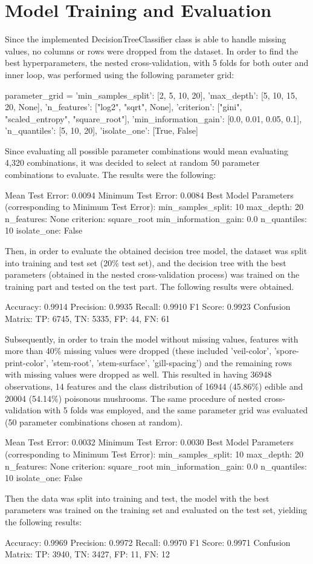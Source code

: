 \documentclass{article}
\begin{document}
\section{Model Training and Evaluation}

Since the implemented DecisionTreeClassifier class is able to handle missing values, no columns or rows were dropped from the dataset. In order to find the best hyperparameters, the nested cross-validation, with 5 folds for both outer and inner loop, was performed using the following parameter grid:

parameter_grid = {
    'min_samples_split': [2, 5, 10, 20],
    'max_depth': [5, 10, 15, 20, None],
    'n_features': ["log2", "sqrt", None],
    'criterion': ["gini", "scaled_entropy", "square_root"],
    'min_information_gain': [0.0, 0.01, 0.05, 0.1],
    'n_quantiles': [5, 10, 20],
    'isolate_one': [True, False]
}
    
Since evaluating all possible parameter combinations would mean evaluating 4,320 combinations, it was decided to select at random 50 parameter combinations to evaluate. The results were the following:

Mean Test Error: 0.0094
Minimum Test Error: 0.0084
Best Model Parameters (corresponding to Minimum Test Error):
  min_samples_split: 10
  max_depth: 20
  n_features: None
  criterion: square_root
  min_information_gain: 0.0
  n_quantiles: 10
  isolate_one: False

Then, in order to evaluate the obtained decision tree model, the dataset was split into training and test set (20\% test set), and the decision tree with the best parameters (obtained in the nested cross-validation process) was trained on the training part and tested on the test part. The following results were obtained.
    
Accuracy: 0.9914
Precision: 0.9935
Recall: 0.9910
F1 Score: 0.9923
Confusion Matrix:
TP: 6745, TN: 5335, FP: 44, FN: 61

Subsequently, in order to train the model without missing values, features with more than 40\% missing values were dropped (these included 'veil-color', 'spore-print-color', 'stem-root', 'stem-surface', 'gill-spacing') and the remaining rows with missing values were dropped as well. This resulted in having 36948 observations, 14 features and the class distribution of 16944 (45.86\%) edible and 20004 (54.14\%) poisonous mushrooms. The same procedure of nested cross-validation with 5 folds was employed, and the same parameter grid was evaluated (50 parameter combinations chosen at random).

Mean Test Error: 0.0032
Minimum Test Error: 0.0030
Best Model Parameters (corresponding to Minimum Test Error):
  min_samples_split: 10
  max_depth: 20
  n_features: None
  criterion: square_root
  min_information_gain: 0.0
  n_quantiles: 10
  isolate_one: False

Then the data was split into training and test, the model with the best parameters was trained on the training set and evaluated on the test set, yielding the following results:

Accuracy: 0.9969
Precision: 0.9972
Recall: 0.9970
F1 Score: 0.9971
Confusion Matrix:
TP: 3940, TN: 3427, FP: 11, FN: 12
\end{document}

